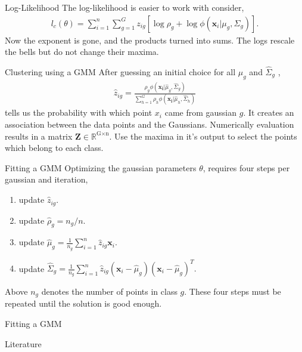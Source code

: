 \documentclass[notes]{beamer}
\begin{document}
    \begin{frame}{Log-Likelihood}
      The log-likelihood is easier to work with consider, 
      \begin{align}
      l_c(\theta) = \sum_{i=1}^{n}\sum_{g=1}^{G} z_{ig} [\log \rho_g + \log \phi(\mathbf{x}_i|\mu_g, \Sigma_g)].
      \end{align}
      Now the exponent is gone, and the products turned into sums. The logs rescale the bells but do not change their maxima.
    \end{frame}


    \begin{frame}{Clustering using a GMM}
      After guessing an initial choice for all $\hat{\mu}_g$ and $\hat{\Sigma}_g$ \cite{mcnicholas2016mixture},
      \begin{align}
      \hat{z}_{ig} = \frac{\rho_g \phi(\mathbf{x_i}| \hat{\mu}_g, \hat{\Sigma}_g)}{\sum_{h=1}^G \rho_h \phi(\mathbf{x_i}| \hat{\mu}_h, \hat{\Sigma}_h) }
      \end{align}
      tells us the probability with which point $x_i$ came from gaussian $g$. It creates an association between the data points and the Gaussians. Numerically evaluation results in a matrix $\mathbf{Z} \in \mathbb{R}^{\text{G} \times \text{n}}$. Use the maxima in it's output to select the points which belong to each class.
    \end{frame}

    \begin{frame}{Fitting a GMM}
      Optimizing the gaussian parameters $\theta$, requires four steps per gaussian and iteration,
      \begin{enumerate}
        \item update $\hat{z}_{ig}.$
        \item update $\hat{\rho}_g = n_g/n.$
        \item update $\hat{\mu}_g = \frac{1}{n_g} \sum_{i=1}^n \hat{z}_{ig} \mathbf{x}_i.$
        \item update $\hat{\Sigma}_g = \frac{1}{n_g} \sum_{i=1}^n \hat{z}_{ig} (\mathbf{x}_i - \hat{\mu}_g)(\mathbf{x}_i - \hat{\mu}_g)^T.$
     \end{enumerate}
      Above $n_g$ denotes the number of points in class $g$. These four steps must be repeated until the solution is good enough.
    \end{frame}

    \begin{frame}{Fitting a GMM}
    \end{frame}

    \begin{frame}{Literature}
      \printbibliography
    \end{frame}
\end{document}
